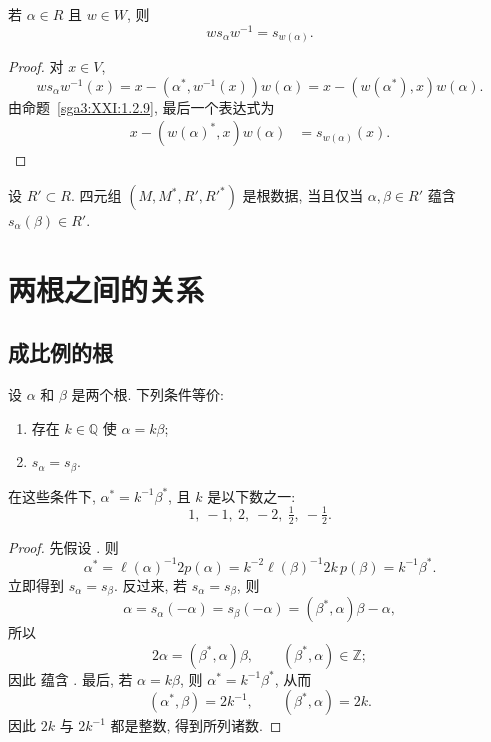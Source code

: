\begin{corollary}\label{sga3:XXI:1.2.10}
若 \(\alpha\in R\) 且 \(w\in W\), 则
\[
 ws_\alpha w^{-1}=s_{w(\alpha)}.
\]
\end{corollary}
\begin{proof}
对 \(x\in V\),
\[
 ws_\alpha w^{-1}(x)
 =x-(\alpha^\ast,w^{-1}(x))w(\alpha)
 =x-(w(\alpha^\ast),x)w(\alpha).
\]
由命题~\ref{sga3:XXI:1.2.9}, 最后一个表达式为
\[
 \begin{aligned}
 x-(w(\alpha)^\ast,x)w(\alpha)
   &=s_{w(\alpha)}(x).
 \end{aligned}
\]
\end{proof}

\begin{corollary}\label{sga3:XXI:1.2.11}\leavevmode\par
设 \(R'\subset R\). 四元组 \((M,M^\ast,R',R'^\ast)\) 是根数据, 当且仅当 \(\alpha,\beta\in R'\) 蕴含 \(s_\alpha(\beta)\in R'\).
\end{corollary}

\section{两根之间的关系}
\subsection{成比例的根}
\begin{proposition}\label{sga3:XXI:2.1.1}
设 \(\alpha\) 和 \(\beta\) 是两个根. 下列条件等价:
\begin{enumerate}
\item[(i)] 存在 \(k\in\mathbb Q\) 使 \(\alpha=k\beta\);
\item[(ii)] \(s_\alpha=s_\beta\).
\end{enumerate}
在这些条件下, \(\alpha^\ast=k^{-1}\beta^\ast\), 且 \(k\) 是以下数之一:
\[
 1,\ -1,\ 2,\ -2,\ \tfrac12,\ -\tfrac12.
\]
\end{proposition}
\begin{proof}
先假设 . 则
\[
 \alpha^\ast
 =\ell(\alpha)^{-1}2p(\alpha)
 =k^{-2}\ell(\beta)^{-1}2k\,p(\beta)
 =k^{-1}\beta^\ast.
\]
立即得到 \(s_\alpha=s_\beta\). 反过来, 若 \(s_\alpha=s_\beta\), 则
\[
 \alpha=s_\alpha(-\alpha)
       =s_\beta(-\alpha)
       =(\beta^\ast,\alpha)\beta-\alpha,
\]
所以
\[
 2\alpha=(\beta^\ast,\alpha)\beta,
\qquad(\beta^\ast,\alpha)\in\mathbb Z;
\]
因此  蕴含 . 最后, 若 \(\alpha=k\beta\), 则 \(\alpha^\ast=k^{-1}\beta^\ast\), 从而
\[
 (\alpha^\ast,\beta)=2k^{-1},
 \qquad(\beta^\ast,\alpha)=2k.
\]
因此 \(2k\) 与 \(2k^{-1}\) 都是整数, 得到所列诸数.
\end{proof}

